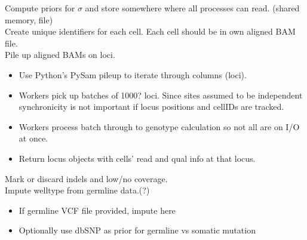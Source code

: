 \documentclass[../../main.tex]{subfiles}
\begin{document}
Compute priors for $\sigma$ and store somewhere where all processes can read. (shared memory, file)\\[1em]
Create unique identifiers for each cell. Each cell should be in own aligned BAM file.\\[1em]
Pile up aligned BAMs on loci.
\begin{itemize}
    \item Use Python's PySam pileup to iterate through columns (loci).
    \item Workers pick up batches of 1000? loci. Since sites assumed to be independent synchronicity is not important if locus positions and cellIDs are tracked.
    \item Workers process batch through to genotype calculation so not all are on I/O at once.
    \item Return locus objects with cells' read and qual info at that locus.
\end{itemize}
\vspace{1em}
Mark or discard indels and low/no coverage.\\[1em]
Impute welltype from germline data.(?)
\begin{itemize}
    \item If germline VCF file provided, impute here
    \item Optionally use dbSNP as prior for germline vs somatic mutation
\end{itemize}
\end{document}

